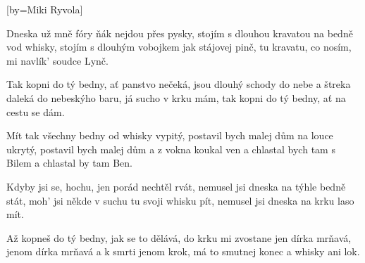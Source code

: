 [by={Miki Ryvola}]

\beginverse{}
Dneska už mně fóry ňák nejdou přes pysky,
stojím s dlouhou kravatou na bedně vod whisky,
stojím s dlouhým vobojkem jak stájovej pinč,
tu kravatu, co nosím, mi navlík' soudce Lynč. 
\endverse{}

\beginchorus{}
Tak kopni do tý bedny, ať panstvo nečeká,
jsou dlouhý schody do nebe a štreka daleká
do nebeskýho baru, já sucho v krku mám,
tak kopni do tý bedny, ať na cestu se dám. 
\endchorus{}

\beginverse{}
Mít tak všechny bedny od whisky vypitý,
postavil bych malej dům na louce ukrytý,
postavil bych malej dům a z vokna koukal ven
a chlastal bych tam s Bilem a chlastal by tam Ben.
\endverse{}

\beginchorus{}
\phantom{}
\endchorus{}

\beginverse{}
Kdyby jsi se, hochu, jen porád nechtěl rvát,
nemusel jsi dneska na týhle bedně stát,
moh' jsi někde v suchu tu svoji whisku pít,
nemusel jsi dneska na krku laso mít.
\endverse{}

\beginchorus{}
\phantom{}
\endchorus{}

\beginverse{}
Až kopneš do tý bedny, jak se to dělává,
do krku mi zvostane jen dírka mrňavá,
jenom dírka mrňavá a k smrti jenom krok,
má to smutnej konec a whisky ani lok.
\endverse{}

\beginchorus{}
\phantom{}
\endchorus{}

\endsong{}
